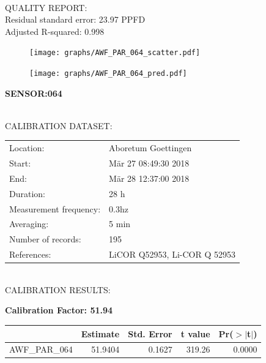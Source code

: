 \documentclass[oneside]{report}
\begin{document}
\hrulefill\\
QUALITY REPORT:\\
Residual standard error: 23.97 PPFD\\
Adjusted R-squared: 0.998



\begin{figure}[H]
  \centering
  \texttt{[image: graphs/AWF\_PAR\_064\_scatter.pdf]}
\end{figure}




\begin{figure}[H]
  \centering
  \texttt{[image: graphs/AWF\_PAR\_064\_pred.pdf]}
\end{figure}

\pagebreak


\begin{center}
\large{\textbf{SENSOR:064}}\\
\end{center}

\hrulefill\\
CALIBRATION DATASET:\\
\begin{table}[h!]
  \centering
  \label{tab:table1}
  \begin{tabular}{ll}
    Location: & Aboretum Goettingen\\ 
    
    
    Start:  & Mär 27 08:49:30 2018 \\
    End:   & Mär 28 12:37:00 2018\\ 
    Duration: & 28 h\\
    Measurement frequency: & 0.3hz\\
    Averaging:  &5 min\\
    Number of records: & 195 \\
    References: & LiCOR Q52953, Li-COR Q 52953 \\
  \end{tabular}
\end{table}

\hrulefill\\
CALIBRATION RESULTS:\\


\begin{center}
\textbf{\large{Calibration Factor: 51.94}}\\
\end{center}
\begin{table}[ht]
\centering
\begin{tabular}{rrrrr}
  \hline
 & Estimate & Std. Error & t value & Pr($>$$|$t$|$) \\ 
  \hline
AWF\_PAR\_064 & 51.9404 & 0.1627 & 319.26 & 0.0000 \\ 
   \hline
\end{tabular}
\end{table}
\end{document}
